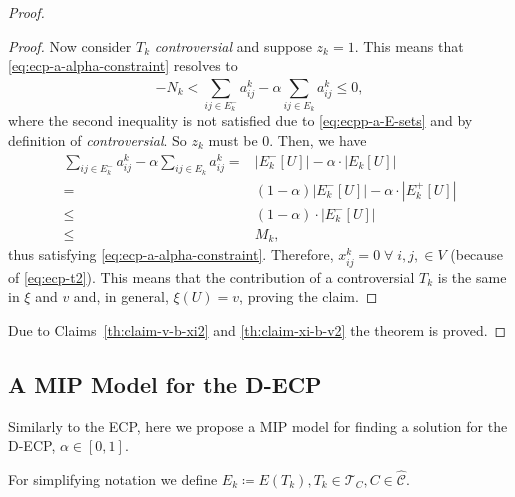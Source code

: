 \begin{proof}
\begin{proof}
		Now consider $T_k$ \emph{controversial} and suppose $z_k = 1$. This means that
		\eqref{eq:ecp-a-alpha-constraint} resolves to
		\begin{equation*}
			-N_k < \sum^{}_{ij \in E^-_k} a_{ij}^{k}  - \alpha \sum^{}_{ij
				\in E_k}
			a_{ij} ^{k} \leq 0,
		\end{equation*}
		where the second inequality is not satisfied due to \eqref{eq:ecpp-a-E-sets} and by
		definition of \emph{controversial}. So $z_k$ must be $0$.
		Then, we have
		\begin{align*}
			\sum^{}_{ij \in E^-_k} a_{ij}^{k}  - \alpha \sum^{}_{ij
				\in E_k}
			a_{ij} ^{k} = & |E^{-}_{k}[U]| - \alpha \cdot |E_{k}[U]|                \\
			=             & (1- \alpha)|E^{-}_{k}[U]| - \alpha \cdot |E^{+}_{k}[U]| \\
			\leq          & (1- \alpha )\cdot |E^{-}_{k}[U]|                        \\
			\leq          & M_k,
		\end{align*}
		thus satisfying \eqref{eq:ecp-a-alpha-constraint}. Therefore, $x_{ij}^{k} = 0 \; \forall \;i, j, \in V$ (because of
		\eqref{eq:ecp-t2}).
		This means that the contribution of a controversial $T_k$ is the same in $\xi$ and $v$ and,
		in general, $\xi(U) = v$, proving the claim.
	\end{proof}

	Due to Claims~\ref{th:claim-v-b-xi2} and \ref{th:claim-xi-b-v2} the theorem
	is proved.
\end{proof}

\subsection{A MIP Model for the \acrshort{D-ECP}}%
\label{sub:a_mip_model_for_the_d_ecp}

Similarly to the \acrshort{ECP}, here we propose a \acrshort{MIP} model for
finding a solution for the \acrshort{D-ECP}, $\alpha \in [0, 1]$.

For simplifying notation we define $E_{k} \coloneqq E(T_{k}), T_{k} \in
	\mathcal{T}_{C}, C \in \mathcal{\hat{C}}$.

